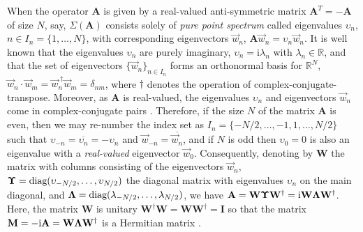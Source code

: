 \documentclass[11pt]{amsart}
\newcommand{\I}{\mathrm{i}}
\newcommand{\Mb}{\mathbf{M}}
\newcommand{\Ib}{\mathbf{I}}
\newcommand{\Ab}{\mathbf{A}}
\newcommand{\Wb}{\mathbf{W}}
\newcommand\bUpsilon{\mbox{\boldmath${\Upsilon}$}}
\newcommand\bLambda{\mbox{\boldmath${\Lambda}$}}
\begin{document}
When the operator $\Ab$ is given by a real-valued anti-symmetric
matrix $\Ab^T=-\Ab$ of size $N$, say, $\Sigma(\Ab)$ consists solely of
\emph{pure point spectrum} called 
eigenvalues $\upsilon_n$, $n\in I_n=\{1,\ldots,N\}$, with corresponding eigenvectors
$\vec{w}_n$, $\Ab\vec{w}_n=\upsilon_n\vec{w}_n$. It is well known
\cite{Horn_Johnson-1990} that the eigenvalues $\upsilon_n$ are purely
imaginary, $\upsilon_n=\I\lambda_n$ with $\lambda_n\in\mathbb{R}$, and that the set of
eigenvectors $\{\vec{w}_n\}_{n\in I_n}$ forms an orthonormal basis
\cite{Keener-2000} for $\mathbb{R}^N$,
$\vec{w}_n\cdot\vec{w}_m=\vec{w}_n^{\;\dagger}\vec{w}_m=\delta_{nm}$, where $\dagger$ 
denotes the operation of complex-conjugate-transpose. Moreover, as 
$\Ab$ is real-valued, the eigenvalues $\upsilon_n$ and eigenvectors
$\vec{w}_n$ come in complex-conjugate pairs
\cite{Horn_Johnson-1990}. Therefore, if the size $N$ of the matrix
$\Ab$ is even, then we may re-number the index set as
$I_n=\{-N/2,\ldots,-1,1,\ldots ,N/2\}$ such that $\upsilon_{-n}=\overline{\upsilon_n}=-\upsilon_n$ and
$\vec{w}_{-n}=\overline{\vec{w}_n}$, and if $N$ is odd then $\upsilon_0=0$ is
also an eigenvalue with a \emph{real-valued} eigenvector
$\vec{w}_0$. Consequently, denoting by $\Wb$ the matrix with columns
consisting of the eigenvectors $\vec{w}_n$,
$\bUpsilon=\text{diag}(\upsilon_{-N/2},\ldots,\upsilon_{N/2})$ the diagonal matrix with
eigenvalues $\upsilon_n$ on the main diagonal, and
$\bLambda=\text{diag}(\lambda_{-N/2},\ldots,\lambda_{N/2})$, we have
$\Ab=\Wb\bUpsilon\Wb^\dagger=\I\Wb\bLambda\Wb^\dagger$. Here, the matrix $\Wb$ is
unitary $\Wb^\dagger\Wb=\Wb\Wb^\dagger=\Ib$ so that the matrix
$\Mb=-\I\Ab=\Wb\bLambda\Wb^\dagger$ is a Hermitian matrix
\cite{Horn_Johnson-1990,Keener-2000}.  
\end{document}
